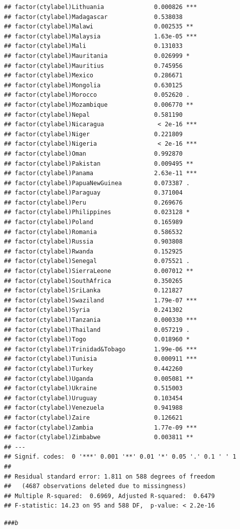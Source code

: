 \documentclass[12pt]{article}\usepackage[]{graphicx}\usepackage[]{color}
\makeatletter
\newcommand{\hlcom}[1]{\textcolor[rgb]{0.678,0.584,0.686}{\textit{#1}}}%
\newenvironment{kframe}{%
 \def\at@end@of@kframe{}%
 \ifinner\ifhmode%
  \def\at@end@of@kframe{\end{minipage}}%
  \begin{minipage}{\columnwidth}%
 \fi\fi%
 \def\FrameCommand##1{\hskip\@totalleftmargin \hskip-\fboxsep
 \colorbox{shadecolor}{##1}\hskip-\fboxsep
     \hskip-\linewidth \hskip-\@totalleftmargin \hskip\columnwidth}%
 \MakeFramed {\advance\hsize-\width
   \@totalleftmargin\z@ \linewidth\hsize
   \@setminipage}}%
 {\par\unskip\endMakeFramed%
 \at@end@of@kframe}
\newenvironment{knitrout}{}{} %
\makeatother
\begin{document}
\begin{knitrout}
\begin{kframe}
\begin{verbatim}
## factor(ctylabel)Lithuania              0.000826 ***
## factor(ctylabel)Madagascar             0.538038    
## factor(ctylabel)Malawi                 0.002535 ** 
## factor(ctylabel)Malaysia               1.63e-05 ***
## factor(ctylabel)Mali                   0.131033    
## factor(ctylabel)Mauritania             0.026999 *  
## factor(ctylabel)Mauritius              0.745956    
## factor(ctylabel)Mexico                 0.286671    
## factor(ctylabel)Mongolia               0.630125    
## factor(ctylabel)Morocco                0.052620 .  
## factor(ctylabel)Mozambique             0.006770 ** 
## factor(ctylabel)Nepal                  0.581190    
## factor(ctylabel)Nicaragua               < 2e-16 ***
## factor(ctylabel)Niger                  0.221809    
## factor(ctylabel)Nigeria                 < 2e-16 ***
## factor(ctylabel)Oman                   0.992870    
## factor(ctylabel)Pakistan               0.009495 ** 
## factor(ctylabel)Panama                 2.63e-11 ***
## factor(ctylabel)PapuaNewGuinea         0.073387 .  
## factor(ctylabel)Paraguay               0.371004    
## factor(ctylabel)Peru                   0.269676    
## factor(ctylabel)Philippines            0.023128 *  
## factor(ctylabel)Poland                 0.165989    
## factor(ctylabel)Romania                0.586532    
## factor(ctylabel)Russia                 0.903808    
## factor(ctylabel)Rwanda                 0.152925    
## factor(ctylabel)Senegal                0.075521 .  
## factor(ctylabel)SierraLeone            0.007012 ** 
## factor(ctylabel)SouthAfrica            0.350265    
## factor(ctylabel)SriLanka               0.121827    
## factor(ctylabel)Swaziland              1.79e-07 ***
## factor(ctylabel)Syria                  0.241302    
## factor(ctylabel)Tanzania               0.000330 ***
## factor(ctylabel)Thailand               0.057219 .  
## factor(ctylabel)Togo                   0.018960 *  
## factor(ctylabel)Trinidad&Tobago        1.99e-06 ***
## factor(ctylabel)Tunisia                0.000911 ***
## factor(ctylabel)Turkey                 0.442260    
## factor(ctylabel)Uganda                 0.005081 ** 
## factor(ctylabel)Ukraine                0.515003    
## factor(ctylabel)Uruguay                0.103454    
## factor(ctylabel)Venezuela              0.941988    
## factor(ctylabel)Zaire                  0.126621    
## factor(ctylabel)Zambia                 1.77e-09 ***
## factor(ctylabel)Zimbabwe               0.003811 ** 
## ---
## Signif. codes:  0 '***' 0.001 '**' 0.01 '*' 0.05 '.' 0.1 ' ' 1
## 
## Residual standard error: 1.811 on 588 degrees of freedom
##   (4687 observations deleted due to missingness)
## Multiple R-squared:  0.6969,	Adjusted R-squared:  0.6479 
## F-statistic: 14.23 on 95 and 588 DF,  p-value: < 2.2e-16
\end{verbatim}
\begin{alltt}
\hlcom{### b}


\end{alltt}
\end{kframe}
\end{knitrout}
\end{document}
